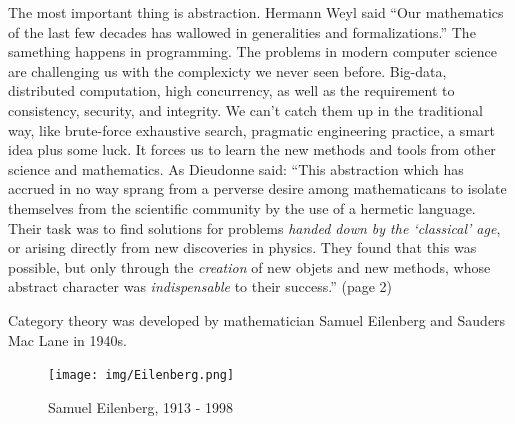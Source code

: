 \documentclass[b5paper]{article}
\begin{document}
The most important thing is abstraction. Hermann Weyl said ``Our mathematics of the last few decades has wallowed in generalities and formalizations.'' The samething happens in programming. The problems in modern computer science are challenging us with the complexicty we never seen before. Big-data, distributed computation, high concurrency, as well as the requirement to consistency, security, and integrity. We can't catch them up in the traditional way, like brute-force exhaustive search, pragmatic engineering practice, a smart idea plus some luck. It forces us to learn the new methods and tools from other science and mathematics. As Dieudonne said: ``This abstraction which has accrued in no way sprang from a perverse desire among mathematicans to isolate themselves from the scientific community by the use of a hermetic language. Their task was to find solutions for problems {\em handed down by the `classical' age}, or arising directly from new discoveries in physics. They found that this was possible, but only through the {\em creation} of new objets and new methods, whose abstract character was {\em indispensable} to their success.'' \cite{Dieudonne1987}(page 2)

Category theory was developed by mathematician Samuel Eilenberg and Sauders Mac Lane in 1940s.

\begin{figure}
 \centering
 \texttt{[image: img/Eilenberg.png]}
 \captionsetup{labelformat=empty}
 \caption{Samuel Eilenberg, 1913 - 1998}
 \label{fig:Eilenberg}
\end{figure}
\end{document}
